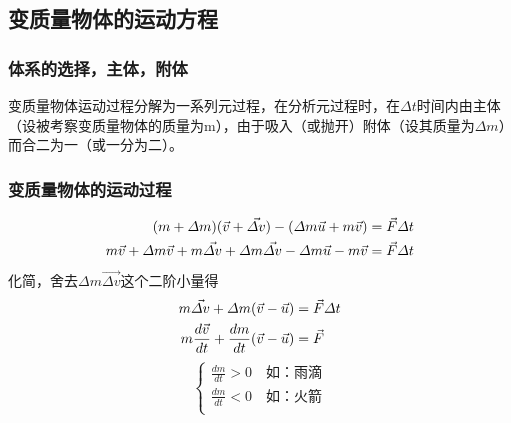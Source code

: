 \subsection{变质量物体的运动方程}
\subsubsection{体系的选择，主体，附体}
变质量物体运动过程分解为一系列元过程，在分析元过程时，在$\varDelta t$时间内由主体（设被考察变质量物体的质量为m），由于吸入（或抛开）附体（设其质量为$\varDelta m$）而合二为一（或一分为二）。
\subsubsection{变质量物体的运动过程}
\begin{align}
(m+\varDelta m)(\vec{v}+\vec{\varDelta v})-(\varDelta m\vec{u}+m\vec{v}) &= \vec{F}\varDelta t \notag \\
m\vec{v}+\varDelta m\vec{v}+m\vec{\varDelta v}+\varDelta m\vec{\varDelta v}-\varDelta m\vec{u}-m\vec{v}&= \vec{F}\varDelta t \notag \\
\end{align}
化简，舍去$\varDelta m\vec{\varDelta v}$这个二阶小量得
\begin{align}
m\vec{\varDelta v}+\varDelta m(\vec{v}-\vec{u})&=\vec{F}\varDelta t \notag \\
m\frac{d\vec{v}}{dt}+\frac{dm}{dt}(\vec{v}-\vec{u})&=\vec{F} \notag
\end{align}
\[\begin{cases}
\frac{dm}{dt}>0\quad\text{如：雨滴}\\
\frac{dm}{dt}<0\quad\text{如：火箭}\\
\end{cases}\]

